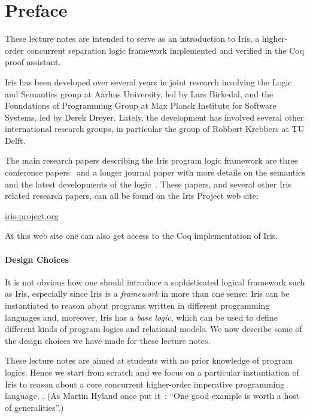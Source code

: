 \section*{Preface}

These lecture notes are intended to serve as an introduction to Iris, 
a higher-order concurrent separation logic framework implemented and verified in the Coq proof assistant.

Iris has been developed over several years in joint research involving the Logic and Semantics group at Aarhus University, led by Lars Birkedal, and the Foundations of Programming Group at Max Planck Institute for Software Systems, led by Derek Dreyer. 
Lately, the development has involved several other international research groups, in particular the group of Robbert Krebbers 
at TU Delft.

The main research papers describing the Iris program logic framework are three conference papers~\cite{iris,iris2,iris3}
and a longer journal paper with more details on the semantics and the latest developments of the 
logic~\cite{iris-ground-up}. These papers, and several other Iris related research papers, 
can all be found on the Iris Project web site:

\begin{center}
  \href{http://iris-project.org}{iris-project.org}
\end{center}

At this web site one can also get access to the Coq implementation of Iris.



\paragraph{Design Choices}

It is not obvious how one should introduce a sophisticated logical framework such as Iris, especially
since Iris is a \emph{framework} in more than one sense: Iris can be instantiated
to reason about programs written in different programming languages and, moreover, 
Iris has a \emph{base logic}, which can be used to define different kinds of program logics and 
relational models. 
We now describe some of the design choices we have made for these lecture notes.

These lecture notes are aimed at students with no prior knowledge of program logics. 
Hence we start from scratch and we focus on a particular instantiation of Iris to reason about
a core concurrent higher-order imperative programming language, \proglang.
(As Martin Hyland once put it~\cite{Hyland:82}: ``One good example is worth a host of generalities''.)



